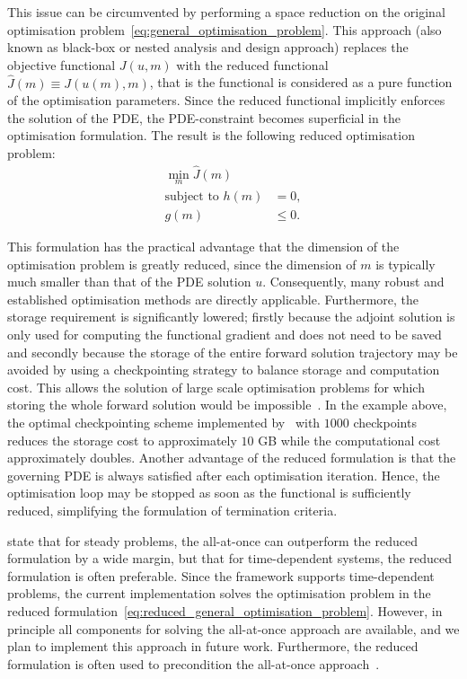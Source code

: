 \documentclass[prodmode,acmtoms]{acmsmall}
\begin{document}
This issue can be circumvented by performing a space reduction on the original optimisation problem~\eqref{eq:general_optimisation_problem}.
This approach (also known as black-box or nested analysis and design approach) replaces the objective functional $J(u, m)$ with the reduced functional~$\hat J(m) \equiv J(u(m), m)$, 
that is the functional is considered as a pure function of the optimisation parameters.
Since the reduced functional implicitly enforces the solution of the PDE, the PDE-constraint becomes superficial in the optimisation formulation.
The result is the following {reduced optimisation problem}:
\begin{equation}
\begin{aligned}
 \min_{ m} \hat J( m)& \\
\textrm{subject to } 
 h( m) & = 0, \\g(m) & \le 0. \end{aligned}\label{eq:reduced_general_optimisation_problem}\end{equation}

This formulation has the practical advantage that the dimension of the optimisation problem is greatly reduced, 
since the dimension of $m$ is typically much smaller than that of the PDE solution $u$. 
Consequently, many robust and established optimisation methods are directly applicable.
Furthermore, the storage requirement is significantly lowered;
firstly because the adjoint solution is only used for computing the functional gradient and does not need to be saved and
secondly because the storage of the entire forward solution trajectory may be avoided by using a checkpointing strategy to balance storage and computation cost. 
This allows the solution of large scale optimisation problems for which storing the whole forward solution would be impossible~\cite{griewank1992}.
In the example above, the optimal checkpointing scheme implemented by~ with $1000$ checkpoints reduces the storage cost to approximately $10$ GB 
while the computational cost approximately doubles.
Another advantage of the reduced formulation is that the governing PDE is always satisfied after each optimisation iteration.
Hence, the optimisation loop may be stopped as soon as the functional is sufficiently reduced, simplifying the formulation of termination criteria.


 state that for steady problems, the all-at-once can outperform the reduced formulation by a wide margin, but that for time-dependent systems, the reduced formulation
is often preferable. Since the framework supports time-dependent problems, the current implementation solves the optimisation problem in the reduced formulation~\eqref{eq:reduced_general_optimisation_problem}.  However, in principle all components for solving the all-at-once approach are available, and we plan to implement this approach in future work. 
Furthermore, the reduced formulation is often used to precondition the all-at-once approach~\cite{biros2000}.
\end{document}
